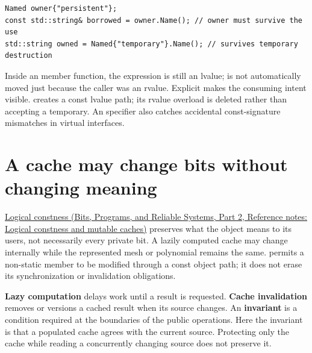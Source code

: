 \begin{verbatim}
Named owner{"persistent"};
const std::string& borrowed = owner.Name(); // owner must survive the use
std::string owned = Named{"temporary"}.Name(); // survives temporary destruction
\end{verbatim}

Inside an \BookInlineCode{{\&}{\&}}{\&\&} member function, the expression  is still an lvalue;  is not automatically moved just because the caller was an rvalue. Explicit  makes the consuming intent visible.  creates a const lvalue path; its rvalue overload is deleted rather than accepting a temporary. An  specifier also catches accidental const-signature mismatches in virtual interfaces.

\section{A cache may change bits without changing meaning}\label{05-engine-i-ch003-a-cache-may-change-bits-without-changing-meaning}

\hypertarget{05-engine-i-ch003-a-cache-may-change-bits-without-changing-meaning}{}

\href{../01-Bits-Programs-and-Reliable-Systems-P02/main.pdf\#appendix-f5593256bcaf}{Logical constness (Bits, Programs, and Reliable Systems, Part 2, Reference notes: Logical constness and mutable caches)} preserves what the object means to its users, not necessarily every private bit. A lazily computed cache may change internally while the represented mesh or polynomial remains the same.  permits a non-static member to be modified through a const object path; it does not erase its synchronization or invalidation obligations.

\textbf{Lazy computation} delays work until a result is requested. \textbf{Cache invalidation} removes or versions a cached result when its source changes. An \textbf{invariant} is a condition required at the boundaries of the public operations. Here the invariant is that a populated cache agrees with the current source. Protecting only the cache while reading a concurrently changing source does not preserve it.

